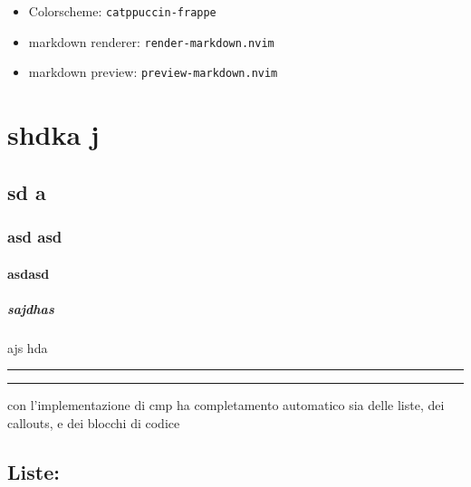 \documentclass[
]{article}
\author{}
\date{}
\providecommand{\tightlist}{%
  \setlength{\itemsep}{0pt}\setlength{\parskip}{0pt}}
\begin{document}
\begin{itemize}
\tightlist
\item
  Colorscheme: \texttt{catppuccin-frappe}
\item
  markdown renderer: \texttt{render-markdown.nvim}
\item
  markdown preview: \texttt{preview-markdown.nvim}
\end{itemize}

\section{shdka j}\label{shdka-j}

\subsection{sd a}\label{sd-a}

\subsubsection{asd asd}\label{asd-asd}

\paragraph{asdasd}\label{asdasd}

\subparagraph{sajdhas}\label{sajdhas}

ajs hda

\begin{center}\rule{0.5\linewidth}{0.5pt}\end{center}

\begin{center}\rule{0.5\linewidth}{0.5pt}\end{center}

con l'implementazione di cmp ha completamento automatico sia delle
liste, dei callouts, e dei blocchi di codice

\subsection{Liste:}\label{liste}
\end{document}

